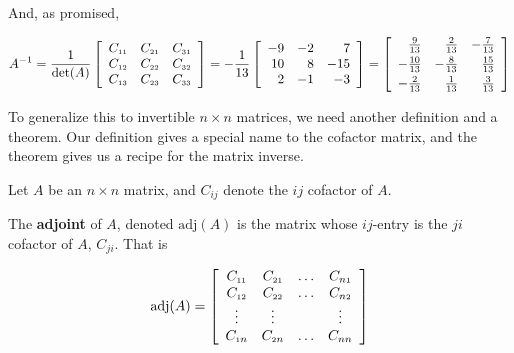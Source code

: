 \documentclass{ximera}
\begin{document}
And, as promised,

\[ A^{-1} = \dfrac{1}{\det(A)} \left[ \begin{array}{ccc} C_{\mbox{\tiny$11$}} & C_{\mbox{\tiny$21$}} & C_{\mbox{\tiny$31$}} \\ C_{\mbox{\tiny$12$}} & C_{\mbox{\tiny$22$}} & C_{\mbox{\tiny$32$}} \\ C_{\mbox{\tiny$13$}} & C_{\mbox{\tiny$23$}} & C_{\mbox{\tiny$33$}} \\ \end{array} \right] = -\dfrac{1}{13} \left[ \begin{array}{rrr} -9 & -2 & 7\\ 10 & 8 & -15 \\ 2  &  -1 &  -3 \\ \end{array} \right]  =  \left[ \begin{array}{rrr} \frac{9}{13} & \frac{2}{13} & -\frac{7}{13} \\[3pt] -\frac{10}{13} & -\frac{8}{13} & \frac{15}{13} \\[3pt] -\frac{2}{13} & \frac{1}{13} & \frac{3}{13} \\ \end{array} \right] \]

To generalize this to invertible $n \times n$ matrices, we need another definition and a theorem.  Our definition gives a special name to the cofactor matrix, and the theorem gives us a recipe for the matrix inverse.

\smallskip


\begin{definition}  \label{matrixadjoint} Let $A$ be an $n \times n$ matrix, and $C_{ij}$ denote the $ij$ cofactor of $A$.  

The \textbf{adjoint} of $A$, denoted $\text{adj}(A)$ is the matrix whose $ij$-entry is the $ji$ cofactor of $A$, $C_{ji}$.  That is

\[ \text{adj}(A) = \left[
\begin{array}{cccc} 
C_{\mbox{\tiny$11$}} & C_{\mbox{\tiny$21$}} & \ldots & C_{n\mbox{\tiny$1$}} \\  
C_{\mbox{\tiny$12$}} & C_{\mbox{\tiny$22$}} & \ldots & C_{n\mbox{\tiny$2$}} \\
   \vdots  & \vdots & & \vdots \\
C_{\mbox{\tiny$1$}n} & C_{\mbox{\tiny$2$}n} & \ldots & C_{nn} \\  \end{array} \right] \]


\end{definition}
\end{document}
